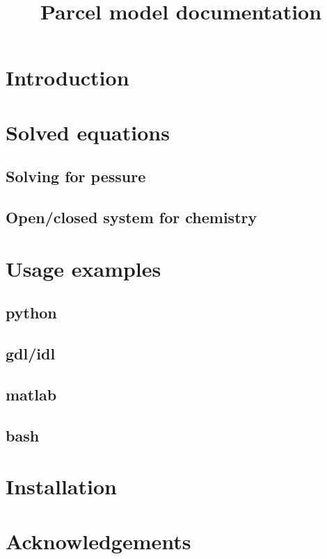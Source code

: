 \documentclass{article}
\date{} %
\title{Parcel model documentation}
\newcommand*\FancyVerbStartString{}
\newcommand*\FancyVerbStopString{}
\newcommand{\codepyt}[4]{%
  \refstepcounter{Listing}%
  \fvset{label=Listing~\theListing#4}%
  \fvset{gobble=#3}%
  \renewcommand*\FancyVerbStartString{\PY{c}{\PYZsh{}\PYZlt{}listing\PYZhy{}#2\PYZgt{}}}%
  \renewcommand*\FancyVerbStopString{\PY{c}{\PYZsh{}\PYZlt{}/listing\PYZhy{}#2\PYZgt{}}}%
  \vspace{-1.5em}%
}
\begin{document}
\twocolumn[
  \begin{@twocolumnfalse}
    \maketitle
  \end{@twocolumnfalse}
]

  \section{Introduction}\label{sec:intro}

  

  \section{Solved equations}\label{sec:eqs}
    \subsection{Solving for pessure}

    


    \subsection{Open/closed system for chemistry}

  \section{Usage examples}
    \subsection{python}
    \subsection{gdl/idl}
    \subsection{matlab}
    \subsection{bash}
 
  
  \appendix

  \section{Installation}\label{sec:install}

  \section*{Acknowledgements}
  \footnotesize

  \renewcommand*{\bibfont}{\footnotesize}
  \printbibliography
\end{document}
